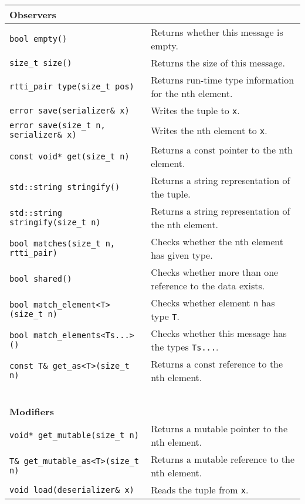 \begin{center}
\begin{tabular}{ll}
  \textbf{Observers} & ~ \\
  \hline
  \lstinline^bool empty()^ & Returns whether this message is empty. \\
  \hline
  \lstinline^size_t size()^ & Returns the size of this message. \\
  \hline
  \lstinline^rtti_pair type(size_t pos)^ & Returns run-time type information for the nth element. \\
  \hline
  \lstinline^error save(serializer& x)^ & Writes the tuple to \lstinline^x^. \\
  \hline
  \lstinline^error save(size_t n, serializer& x)^ & Writes the nth element to \lstinline^x^. \\
  \hline
  \lstinline^const void* get(size_t n)^ & Returns a const pointer to the nth element. \\
  \hline
  \lstinline^std::string stringify()^ & Returns a string representation of the tuple. \\
  \hline
  \lstinline^std::string stringify(size_t n)^ & Returns a string representation of the nth element. \\
  \hline
  \lstinline^bool matches(size_t n, rtti_pair)^ & Checks whether the nth element has given type. \\
  \hline
  \lstinline^bool shared()^ & Checks whether more than one reference to the data exists. \\
  \hline
  \lstinline^bool match_element<T>(size_t n)^ & Checks whether element \lstinline^n^ has type \lstinline^T^. \\
  \hline
  \lstinline^bool match_elements<Ts...>()^ & Checks whether this message has the types \lstinline^Ts...^. \\
  \hline
  \lstinline^const T& get_as<T>(size_t n)^ & Returns a const reference to the nth element. \\
  \hline
  ~ & ~ \\ \textbf{Modifiers} & ~ \\
  \hline
  \lstinline^void* get_mutable(size_t n)^ & Returns a mutable pointer to the nth element. \\
  \hline
  \lstinline^T& get_mutable_as<T>(size_t n)^ & Returns a mutable reference to the nth element. \\
  \hline
  \lstinline^void load(deserializer& x)^ & Reads the tuple from \lstinline^x^. \\
  \hline
\end{tabular}
\end{center}

